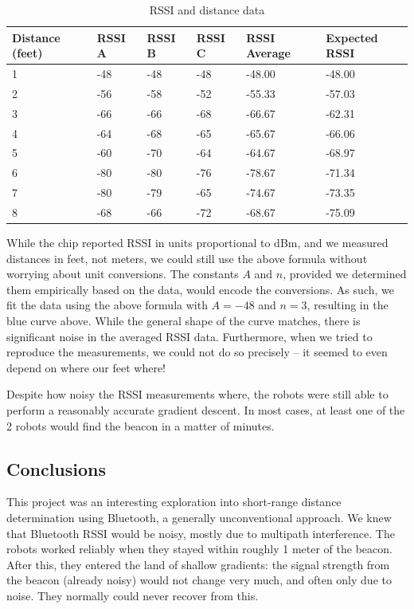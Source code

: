 \documentclass[]{article}
\begin{document}
\begin{table}
  \centering
  \begin{tabular}[]{@{}llllll@{}}
  \toprule
  Distance (feet) & RSSI A & RSSI B & RSSI C & RSSI Average & Expected
  RSSI \\
  \midrule
  1 & -48 & -48 & -48 & -48.00 & -48.00 \\
  2 & -56 & -58 & -52 & -55.33 & -57.03 \\
  3 & -66 & -66 & -68 & -66.67 & -62.31 \\
  4 & -64 & -68 & -65 & -65.67 & -66.06 \\
  5 & -60 & -70 & -64 & -64.67 & -68.97 \\
  6 & -80 & -80 & -76 & -78.67 & -71.34 \\
  7 & -80 & -79 & -65 & -74.67 & -73.35 \\
  8 & -68 & -66 & -72 & -68.67 & -75.09 \\
  \bottomrule
  \end{tabular}
  \caption{RSSI and distance data}
  \label{table:rssidata}
\end{table}

While the chip reported RSSI in units proportional to dBm, and we
measured distances in feet, not meters, we could still use the above
formula without worrying about unit conversions. The constants $A$ and
$n$, provided we determined them empirically based on the data, would
encode the conversions. As such, we fit the data using the above formula
with $A=-48$ and $n=3$, resulting in the blue curve above. While the
general shape of the curve matches, there is significant noise in the
averaged RSSI data. Furthermore, when we tried to reproduce the
measurements, we could not do so precisely -- it seemed to even depend
on where our feet where!

Despite how noisy the RSSI measurements where, the robots were still
able to perform a reasonably accurate gradient descent. In most cases,
at least one of the 2 robots would find the beacon in a matter of
minutes.

\subsection{Conclusions}

This project was an interesting exploration into short-range distance
determination using Bluetooth, a generally unconventional approach.
We knew that Bluetooth RSSI would be noisy, mostly due to multipath interference.
The robots worked reliably when they stayed within roughly 1 meter of the beacon.
After this, they entered the land of shallow gradients:
the signal strength from the beacon (already noisy) would not change very
much, and often only due to noise.
They normally could never recover from this.
\end{document}
